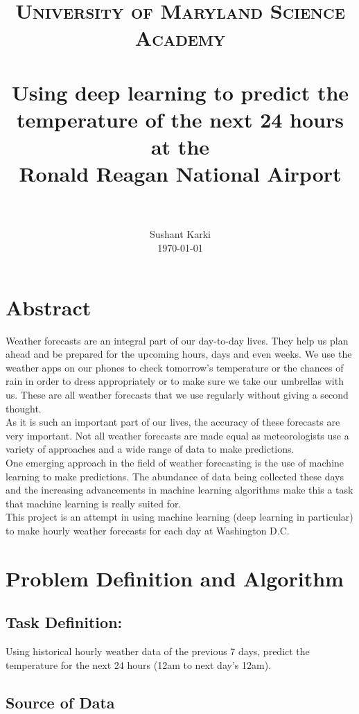 \documentclass[paper=a4, fontsize=11pt, margin=1in]{scrartcl}
\title{
		\usefont{OT1}{bch}{b}{n}
		\normalfont \normalsize \textsc{University of Maryland Science Academy} \\ [25pt]
		\horrule{0.5pt} \\[0.4cm]
		\huge Using deep learning to predict the temperature of the next 24 hours at the \\
  Ronald Reagan National Airport  \\
		\horrule{2pt} \\[0.5cm]
}
\author{
		\normalfont 								\normalsize
        Sushant Karki\\[-3pt]		\normalsize
        \today
}
\date{}
\numberwithin{equation}{section}		%
\numberwithin{figure}{section}			%
\numberwithin{table}{section}				%
\begin{document}
\maketitle
\section{\textbf{Abstract}}
Weather forecasts are an integral part of our day-to-day lives. They help us plan ahead and be prepared for the upcoming hours, days and even weeks. We use the weather apps on our phones to check tomorrow's temperature or the chances of rain in order to dress appropriately or to make sure we take our umbrellas with us. These are all weather forecasts that we use regularly without giving a second thought.\\

As it is such an important part of our lives, the accuracy of these forecasts are very important. Not all weather forecasts are made equal as meteorologists use a variety of approaches and a wide range of data to make predictions. \\ 

One emerging approach in the field of weather forecasting is the use of machine learning to make predictions. The abundance of data being collected these days and the increasing advancements in machine learning algorithms make this a task that machine learning is really suited for.\\

This project is an attempt in using machine learning (deep learning in particular) to make hourly weather forecasts for each day at Washington D.C. 

\break

\section{\textbf{Problem Definition and Algorithm}}

\subsection{\textbf{Task Definition: }} 
Using historical hourly weather data of the previous 7 days, predict the temperature for the next 24 hours (12am to next day's 12am).

\subsection{\textbf{Source of Data}}
\end{document}
